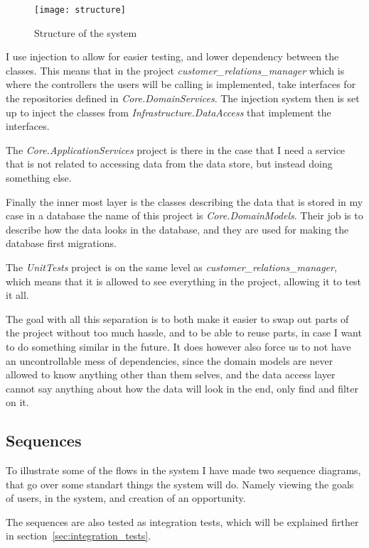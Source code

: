 \begin{figure}[h]
  \centering
  \texttt{[image: structure]}
  \caption{Structure of the system}
  \label{fig:structure}
\end{figure}

I use injection to allow for easier testing, and lower dependency between the classes. This means that in the project \textit{customer\_relations\_manager} which is where the controllers the users will be calling is implemented, take interfaces for the repositories defined in \textit{Core.DomainServices}. The injection system then is set up to inject the classes from \textit{Infrastructure.DataAccess} that implement the interfaces.

The \textit{Core.ApplicationServices} project is there in the case that I need a service that is not related to accessing data from the data store, but instead doing something else.

Finally the inner most layer is the classes describing the data that is stored in my case in a database the name of this project is \textit{Core.DomainModels}. Their job is to describe how the data looks in the database, and they are used for making the database first migrations.

The \textit{UnitTests} project is on the same level as \textit{customer\_relations\_manager}, which means that it is allowed to see everything in the project, allowing it to test it all.

The goal with all this separation is to both make it easier to swap out parts of the project without too much hassle, and to be able to reuse parts, in case I want to do something similar in the future. It does however also force us to not have an uncontrollable mess of dependencies, since the domain models are never allowed to know anything other than them selves, and the data access layer cannot say anything about how the data will look in the end, only find and filter on it.

\subsection{Sequences}
\label{subsec:sequences}
To illustrate some of the flows in the system I have made two sequence diagrams,
that go over some standart things the system will do. Namely viewing the goals
of users, in the system, and creation of an opportunity.

The sequences are also tested as integration tests, which will be explained
firther in section~\ref{sec:integration_tests}.

